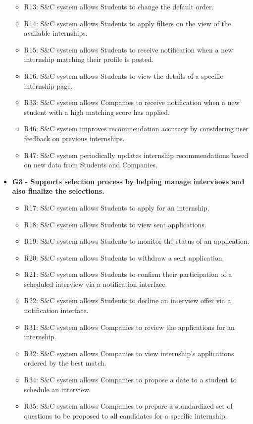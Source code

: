 \begin{itemize}
\begin{itemize}
        \item R13: S\&C system allows Students to change the default order.
        \item R14: S\&C system allows Students to apply filters on the view of the available internships.
        \item R15: S\&C system allows Students to receive notification when a new internship matching their profile is posted.
        \item R16: S\&C system allows Students to view the details of a specific internship page.
        \item R33: S\&C system allows Companies to receive notification when a new student with a high matching score has applied.
        \item R46: S\&C system improves recommendation accuracy by considering user feedback on previous internships.
        \item R47: S\&C system periodically updates internship recommendations based on new data from Students and Companies.
    \end{itemize}
    \item \textbf{G3 - Supports selection process by helping manage interviews and also finalize the selections.}
    \begin{itemize}
        \item R17: S\&C system allows Students to apply for an internship.
        \item R18: S\&C system allows Students to view sent applications.
        \item R19: S\&C system allows Students to monitor the status of an application.
        \item R20: S\&C system allows Students to withdraw a sent application.
        \item R21: S\&C system allows Students to confirm their participation of a scheduled interview via a notification interface.
        \item R22: S\&C system allows Students to decline an interview offer via a notification interface.
        \item R31: S\&C system allows Companies to review the applications for an internship.
        \item R32: S\&C system allows Companies to view internship's applications ordered by the best match.
        \item R34: S\&C system allows Companies to propose a date to a student to schedule an interview.
        \item R35: S\&C system allows Companies to prepare a standardized set of questions to be proposed to all candidates for a specific internship.

\end{itemize}
\end{itemize}
